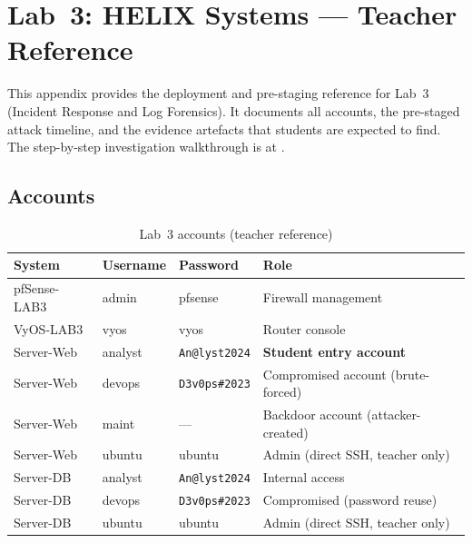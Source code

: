 
\chapter{Lab~3: HELIX Systems --- Teacher Reference}
\label{app:lab3}

This appendix provides the deployment and pre-staging reference for Lab~3 (Incident
Response and Log Forensics). It documents all accounts, the pre-staged attack timeline,
and the evidence artefacts that students are expected to find. The step-by-step
investigation walkthrough is at .

\section*{Accounts}

\begin{table}[H]
\centering
\begin{tabularx}{\textwidth}{lll>{\raggedright\arraybackslash}X}
\toprule
\textbf{System} & \textbf{Username} & \textbf{Password} & \textbf{Role} \\
\midrule
pfSense-LAB3  & admin    & pfsense          & Firewall management \\
VyOS-LAB3     & vyos     & vyos             & Router console \\
Server-Web    & analyst  & \texttt{An@lyst2024}  & \textbf{Student entry account} \\
Server-Web    & devops   & \texttt{D3v0ps\#2023} & Compromised account (brute-forced) \\
Server-Web    & maint    & ---              & Backdoor account (attacker-created) \\
Server-Web    & ubuntu   & ubuntu           & Admin (direct SSH, teacher only) \\
Server-DB     & analyst  & \texttt{An@lyst2024}  & Internal access \\
Server-DB     & devops   & \texttt{D3v0ps\#2023} & Compromised (password reuse) \\
Server-DB     & ubuntu   & ubuntu           & Admin (direct SSH, teacher only) \\
\bottomrule
\end{tabularx}
\caption{Lab~3 accounts (teacher reference)}
\label{tab:lab3-accounts}
\end{table}

